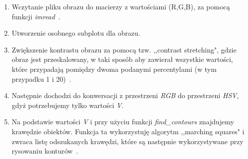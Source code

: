 \documentclass{article}
\begin{document}
\begin{enumerate}
\item Wczytanie pliku obrazu do macierzy z wartościami (R,G,B), za pomocą funkcji \textit{imread}~\cite{imread}.
\item Utworzenie osobnego subplotu dla obrazu.
\item Zwiększenie kontrastu obrazu za pomocą tzw. ,,contrast stretching", gdzie obraz jest przeskalowany, w taki sposób aby zawierał wszystkie wartości, które przypadają pomiędzy dwoma podanymi percentylami (w tym przypadku 1 i 20)~\cite{kontrast}.
\item Następnie dochodzi do konwersacji z przestrzeni \textit{RGB} do przestrzeni \textit{HSV}, gdyż potrzebujemy tylko wartości \textit{V}.
\item Na podstawie wartości \textit{V} i przy użyciu funkcji \textit{find\_contours} znajdujemy krawędzie obiektów. Funkcja ta wykorzystuję algorytm ,,marching squares" i zwraca listę odszukanych krawędzi, które są następnie wykorzystywane przy rysowaniu konturów~\cite{kontury}. 
\end{enumerate}

 
{}
\end{document}
